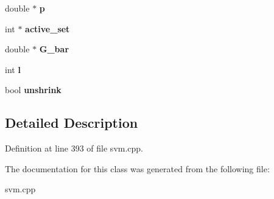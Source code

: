 \begin{DoxyCompactItemize}
\item 
\hypertarget{class_solver_a882cce072f56679880d409e3e73f7ae8}{
double $\ast$ {\bfseries p}}
\label{class_solver_a882cce072f56679880d409e3e73f7ae8}

\item 
\hypertarget{class_solver_a6382277606a9b3df3d2f0ac947e1cde3}{
int $\ast$ {\bfseries active\_\-set}}
\label{class_solver_a6382277606a9b3df3d2f0ac947e1cde3}

\item 
\hypertarget{class_solver_a89e58cf39a0415c9032b8ec2f4575dcc}{
double $\ast$ {\bfseries G\_\-bar}}
\label{class_solver_a89e58cf39a0415c9032b8ec2f4575dcc}

\item 
\hypertarget{class_solver_a88832d45b6de977b1cbb2afd4c0e494c}{
int {\bfseries l}}
\label{class_solver_a88832d45b6de977b1cbb2afd4c0e494c}

\item 
\hypertarget{class_solver_a62ded1c184aeb28f8dee04eb4a10530a}{
bool {\bfseries unshrink}}
\label{class_solver_a62ded1c184aeb28f8dee04eb4a10530a}

\end{DoxyCompactItemize}


\subsection{Detailed Description}


Definition at line 393 of file svm.cpp.



The documentation for this class was generated from the following file:\begin{DoxyCompactItemize}
\item 
svm.cpp\end{DoxyCompactItemize}
